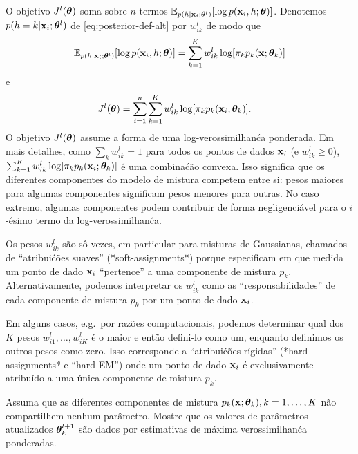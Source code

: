\begin{exenumerate}
\begin{solution}
        O objetivo $J^l(\boldsymbol{\theta})$ soma sobre $n$ termos $ \mathbb{E}_{p(h| \mathbf{x}_i; \boldsymbol{\theta}^l)}[ \log p(\mathbf{x}_i, h;
        \boldsymbol{\theta})]$. Denotemos $p(h=k|\mathbf{x}_i; \boldsymbol{\theta}^l)$ de \eqref{eq:posterior-def-alt} por $w_{ik}^l$ de modo que
        \begin{equation}
            \mathbb{E}_{p(h| \mathbf{x}_i; \boldsymbol{\theta}^l)}[ \log p(\mathbf{x}_i, h; \boldsymbol{\theta})] =  \sum_{k=1}^K w_{ik}^l  \log[  \pi_k  p_k(\mathbf{x}; \boldsymbol{\theta}_k) ]
        \end{equation}
        e
        \begin{align}
            J^l(\boldsymbol{\theta}) & = \sum_{i=1}^n  \sum_{k=1}^K w_{ik}^l  \log[  \pi_k  p_k(\mathbf{x}_i; \boldsymbol{\theta}_k) ].
        \end{align}
        O objetivo $J^l(\boldsymbol{\theta})$ assume a forma de uma log-verossimilhan\'ca ponderada. Em
        mais detalhes, como $\sum_k w_{ik}^l=1$ para todos os pontos de dados $\mathbf{x}_i$ (e
        $w_{ik}^l \ge 0 $), $ \sum_{k=1}^K w_{ik}^l \log[ \pi_k p_k(\mathbf{x}_i; \boldsymbol{\theta}_k)
        ]$ \'e uma combina\'c\~ao convexa. Isso significa que os diferentes componentes do
        modelo de mistura competem entre si: pesos maiores para algumas
        componentes significam pesos menores para outras. No caso extremo, algumas
        componentes podem contribuir de forma negligenci\'avel para o $i$-\'esimo termo da
        log-verossimilhan\'ca.
        
        Os pesos $w_{ik}^l$ s\~ao s\^o vezes, em particular para misturas de
        Gaussianas, chamados de ``atribui\'c\~oes suaves'' (*soft-assignments*) porque especificam em que medida
        um ponto de dado $\mathbf{x}_i$ ``pertence'' a uma componente de mistura $p_k$.
        Alternativamente, podemos interpretar os $w_{ik}^l$ como as
        ``responsabilidades'' de cada componente de mistura $p_k$ por um ponto de dado $\mathbf{x}_i$.
        
        Em alguns casos, e.g.\ por raz\~oes computacionais, podemos determinar qual dos
        $K$ pesos $w_{i1}^l, \ldots, w_{iK}^l$ \'e o maior e ent\~ao defini-lo como
        um, enquanto definimos os outros pesos como zero. Isso corresponde a
        ``atribui\'c\~oes r\'igidas'' (*hard-assignments* e ``hard EM'') onde um ponto de dado $\mathbf{x}_i$ \'e
        exclusivamente atribu\'ido a uma \'unica componente de mistura $p_k$. 
    \end{solution}
    
    \item Assuma que as diferentes componentes de mistura $p_k(\mathbf{x}; \boldsymbol{\theta}_k), k=1,
    \ldots, K$ n\~ao compartilhem nenhum par\^ametro. Mostre que os valores de par\^ametros atualizados
    $\boldsymbol{\theta}_k^{l+1}$ s\~ao dados por estimativas de m\'axima verossimilhan\'ca ponderadas.
    

\end{exenumerate}

